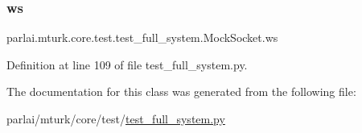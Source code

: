 \subsubsection{\texorpdfstring{ws}{ws}}
{\footnotesize\ttfamily parlai.\+mturk.\+core.\+test.\+test\+\_\+full\+\_\+system.\+Mock\+Socket.\+ws}



Definition at line 109 of file test\+\_\+full\+\_\+system.\+py.



The documentation for this class was generated from the following file\+:\begin{DoxyCompactItemize}
\item 
parlai/mturk/core/test/\hyperlink{test_2test__full__system_8py}{test\+\_\+full\+\_\+system.\+py}\end{DoxyCompactItemize}
